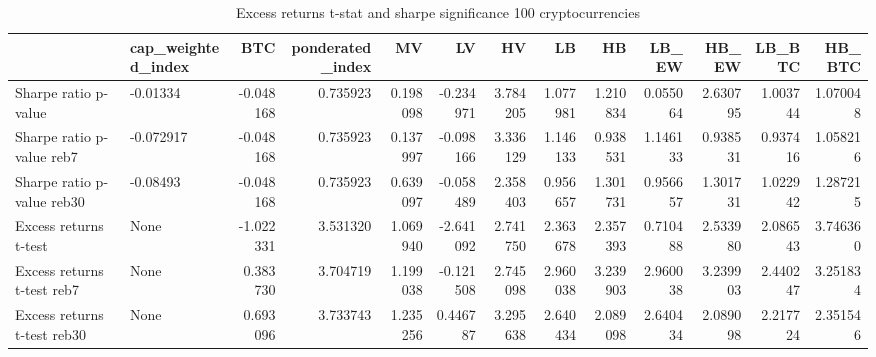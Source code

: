 \begin{table}
\centering
\caption{Excess returns t-stat and sharpe significance 100 cryptocurrencies}
\label{signif100_30}
\begin{tabular}{llrrrrrrrrrrr}
\toprule
{} & cap\_weighted\_index &       BTC &  ponderated\_index &        MV &        LV &        HV &        LB &        HB &     LB\_EW &     HB\_EW &    LB\_BTC &    HB\_BTC \\
\midrule
Sharpe ratio p-value        &           -0.01334 & -0.048168 &          0.735923 &  0.198098 & -0.234971 &  3.784205 &  1.077981 &  1.210834 &  0.055064 &  2.630795 &  1.003744 &  1.070048 \\
Sharpe ratio p-value reb7   &          -0.072917 & -0.048168 &          0.735923 &  0.137997 & -0.098166 &  3.336129 &  1.146133 &  0.938531 &  1.146133 &  0.938531 &  0.937416 &  1.058216 \\
Sharpe ratio p-value reb30  &           -0.08493 & -0.048168 &          0.735923 &  0.639097 & -0.058489 &  2.358403 &  0.956657 &  1.301731 &  0.956657 &  1.301731 &  1.022942 &  1.287215 \\
Excess returns t-test       &               None & -1.022331 &          3.531320 &  1.069940 & -2.641092 &  2.741750 &  2.363678 &  2.357393 &  0.710488 &  2.533980 &  2.086543 &  3.746360 \\
Excess returns t-test reb7  &               None &  0.383730 &          3.704719 &  1.199038 & -0.121508 &  2.745098 &  2.960038 &  3.239903 &  2.960038 &  3.239903 &  2.440247 &  3.251834 \\
Excess returns t-test reb30 &               None &  0.693096 &          3.733743 &  1.235256 &  0.446787 &  3.295638 &  2.640434 &  2.089098 &  2.640434 &  2.089098 &  2.217724 &  2.351546 \\
\bottomrule
\end{tabular}
\end{table}
